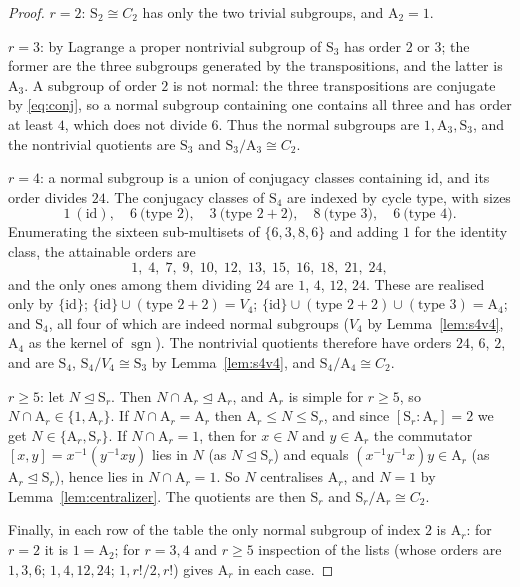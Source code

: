 \documentclass[11pt]{article}
\theoremstyle{plain}
\theoremstyle{definition}
\theoremstyle{remark}
\numberwithin{equation}{section}
\newcommand{\Sym}{\mathrm{S}}
\newcommand{\Alt}{\mathrm{A}}
\DeclareMathOperator{\sgn}{sgn}
\newcommand{\normal}{\trianglelefteq}
\begin{document}
\begin{proof}
$r = 2$: $\Sym_2 \cong C_2$ has only the two trivial subgroups, and $\Alt_2 = 1$.

$r = 3$: by Lagrange a proper nontrivial subgroup of $\Sym_3$ has order $2$ or $3$; the former
are the three subgroups generated by the transpositions, and the latter is $\Alt_3$. A subgroup
of order $2$ is not normal: the three transpositions are conjugate by \eqref{eq:conj}, so a
normal subgroup containing one contains all three and has order at least $4$, which does not
divide $6$. Thus the normal subgroups are $1, \Alt_3, \Sym_3$, and the nontrivial quotients are
$\Sym_3$ and $\Sym_3/\Alt_3 \cong C_2$.

$r = 4$: a normal subgroup is a union of conjugacy classes containing $\mathrm{id}$, and its
order divides $24$. The conjugacy classes of $\Sym_4$ are indexed by cycle type, with sizes
\[
1\ (\mathrm{id}),\quad 6\ \bigl(\text{type } 2\bigr),\quad 3\ \bigl(\text{type } 2{+}2\bigr),
\quad 8\ \bigl(\text{type }3\bigr),\quad 6\ \bigl(\text{type }4\bigr).
\]
Enumerating the sixteen sub-multisets of $\{6,3,8,6\}$ and adding $1$ for the identity class, the
attainable orders are
\[
1,\;4,\;7,\;9,\;10,\;12,\;13,\;15,\;16,\;18,\;21,\;24,
\]
and the only ones among them dividing $24$ are $1$, $4$, $12$, $24$.
These are realised only by $\{\mathrm{id}\}$; $\{\mathrm{id}\}\cup(\text{type }2{+}2) = V_4$;
$\{\mathrm{id}\}\cup(\text{type }2{+}2)\cup(\text{type }3) = \Alt_4$; and $\Sym_4$, all four of
which are indeed normal subgroups ($V_4$ by Lemma~\ref{lem:s4v4}, $\Alt_4$ as the kernel of
$\sgn$). The nontrivial quotients therefore have orders $24$, $6$, $2$, and are $\Sym_4$,
$\Sym_4/V_4 \cong \Sym_3$ by Lemma~\ref{lem:s4v4}, and $\Sym_4/\Alt_4 \cong C_2$.

$r \ge 5$: let $N \normal \Sym_r$. Then $N \cap \Alt_r \normal \Alt_r$, and $\Alt_r$ is simple
for $r \ge 5$, so $N \cap \Alt_r \in \{1, \Alt_r\}$. If $N \cap \Alt_r = \Alt_r$ then
$\Alt_r \le N \le \Sym_r$, and since $[\Sym_r : \Alt_r] = 2$ we get $N \in \{\Alt_r,\Sym_r\}$. If
$N \cap \Alt_r = 1$, then for $x \in N$ and $y \in \Alt_r$ the commutator
$[x,y] = x^{-1}(y^{-1}xy)$ lies in $N$ (as $N \normal \Sym_r$) and equals
$(x^{-1}y^{-1}x)y \in \Alt_r$ (as $\Alt_r \normal \Sym_r$), hence lies in $N \cap \Alt_r = 1$. So
$N$ centralises $\Alt_r$, and $N = 1$ by Lemma~\ref{lem:centralizer}. The quotients are then
$\Sym_r$ and $\Sym_r/\Alt_r \cong C_2$.

Finally, in each row of the table the only normal subgroup of index $2$ is $\Alt_r$: for $r = 2$
it is $1 = \Alt_2$; for $r = 3,4$ and $r \ge 5$ inspection of the lists (whose orders are
$1,3,6$; $1,4,12,24$; $1,r!/2,r!$) gives $\Alt_r$ in each case.
\end{proof}
\end{document}
